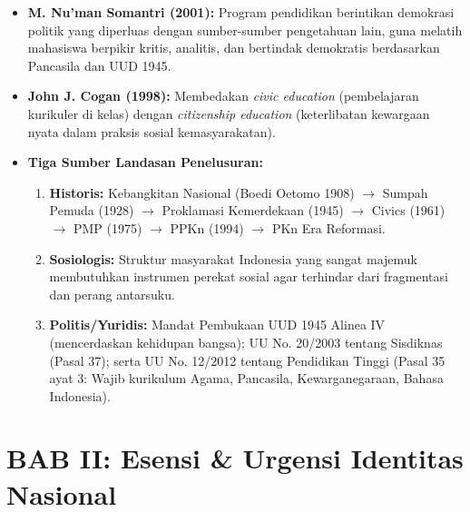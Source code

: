 \documentclass[10pt,a4paper]{article}
\begin{document}
\begin{conceptbox}
\begin{itemize}
  \item \textbf{M. Nu'man Somantri (2001):} Program pendidikan berintikan demokrasi politik yang diperluas dengan sumber-sumber pengetahuan lain, guna melatih mahasiswa berpikir kritis, analitis, dan bertindak demokratis berdasarkan Pancasila dan UUD 1945.
  \item \textbf{John J. Cogan (1998):} Membedakan \textit{civic education} (pembelajaran kurikuler di kelas) dengan \textit{citizenship education} (keterlibatan kewargaan nyata dalam praksis sosial kemasyarakatan).
  \item \textbf{Tiga Sumber Landasan Penelusuran:}
  \begin{enumerate}
    \item \textbf{Historis:} Kebangkitan Nasional (Boedi Oetomo 1908) $\rightarrow$ Sumpah Pemuda (1928) $\rightarrow$ Proklamasi Kemerdekaan (1945) $\rightarrow$ Civics (1961) $\rightarrow$ PMP (1975) $\rightarrow$ PPKn (1994) $\rightarrow$ PKn Era Reformasi.
    \item \textbf{Sosiologis:} Struktur masyarakat Indonesia yang sangat majemuk membutuhkan instrumen perekat sosial agar terhindar dari fragmentasi dan perang antarsuku.
    \item \textbf{Politis/Yuridis:} Mandat Pembukaan UUD 1945 Alinea IV (mencerdaskan kehidupan bangsa); UU No. 20/2003 tentang Sisdiknas (Pasal 37); serta UU No. 12/2012 tentang Pendidikan Tinggi (Pasal 35 ayat 3: Wajib kurikulum Agama, Pancasila, Kewarganegaraan, Bahasa Indonesia).
  \end{enumerate}
\end{itemize}
\end{conceptbox}

\section*{BAB II: Esensi \& Urgensi Identitas Nasional}
\end{document}
